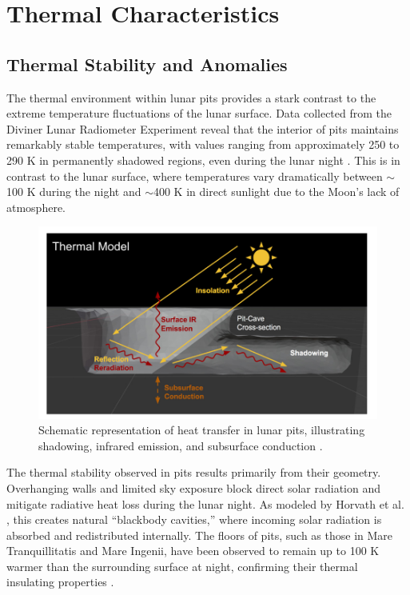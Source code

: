 \graphicspath{{img/ch3}}

\section{Thermal Characteristics}

\subsection{Thermal Stability and Anomalies}

The thermal environment within lunar pits provides a stark contrast to the extreme temperature fluctuations of the lunar surface. Data collected from the Diviner Lunar Radiometer Experiment reveal that the interior of pits maintains remarkably stable temperatures, with values ranging from approximately 250 to 290 K in permanently shadowed regions, even during the lunar night \cite{thermal-lunar-pits}. This is in contrast to the lunar surface, where temperatures vary dramatically between $\sim$100 K during the night and $\sim$400 K in direct sunlight due to the Moon’s lack of atmosphere.

\begin{figure}[H]
    \centering
    \includegraphics[width=0.6\linewidth]{lunar-pit-thermal-model.png}
    \caption{Schematic representation of heat transfer in lunar pits, illustrating shadowing, infrared emission, and subsurface conduction \cite{thermal-lunar-pits}.}
    \label{fig:lunar-pit-thermal-model}
\end{figure}

The thermal stability observed in pits results primarily from their geometry. Overhanging walls and limited sky exposure block direct solar radiation and mitigate radiative heat loss during the lunar night. As modeled by Horvath et al. \cite{thermal-lunar-pits}, this creates natural “blackbody cavities,” where incoming solar radiation is absorbed and redistributed internally. The floors of pits, such as those in Mare Tranquillitatis and Mare Ingenii, have been observed to remain up to 100 K warmer than the surrounding surface at night, confirming their thermal insulating properties \cite{thermal-lunar-pits, newer-thermal}.

